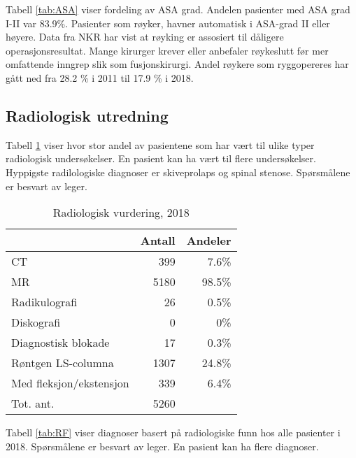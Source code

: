 \documentclass [norsk,a4paper,twoside]{article}\usepackage[]{graphicx}\usepackage[]{color}
\begin{document}
Tabell \ref{tab:ASA} viser fordeling av ASA grad. Andelen pasienter med ASA grad I-II 
var 83.9\%. Pasienter som røyker, havner 
automatisk i ASA-grad II eller høyere. Data fra NKR har vist at røyking er assosiert til dåligere operasjonsresultat.
Mange kirurger krever eller anbefaler røykeslutt før mer omfattende inngrep slik som fusjonskirurgi.
Andel røykere som ryggopereres har gått ned fra 28.2 \% i 2011 til 17.9 \% i 2018. 



\subsection{Radiologisk utredning}

Tabell \ref{tab:RV} viser hvor stor andel av pasientene som har vært til ulike typer 
radiologisk undersøkelser. En pasient kan ha vært til flere undersøkelser. Hyppigste radilologiske diagnoser er skiveprolaps og spinal stenose.
Spørsmålene er besvart av leger. 

\begin{table}[ht]
\centering
\begin{tabular}{lrr}
  \hline
 & Antall & Andeler \\ 
  \hline
CT & 399 & 7.6\% \\ 
  MR & 5180 & 98.5\% \\ 
  Radikulografi & 26 & 0.5\% \\ 
  Diskografi & 0 & 0\% \\ 
  Diagnostisk blokade & 17 & 0.3\% \\ 
  Røntgen LS-columna & 1307 & 24.8\% \\ 
  Med fleksjon/ekstensjon & 339 & 6.4\% \\ 
  Tot. ant. & 5260 &   \\ 
   \hline
\end{tabular}
\caption{Radiologisk vurdering, 2018} 
\label{tab:RV}
\end{table}




Tabell \ref{tab:RF} viser diagnoser basert på radiologiske funn hos alle pasienter 
i 2018. 
Spørsmålene er besvart av leger.
En pasient kan ha flere diagnoser.
\end{document}
